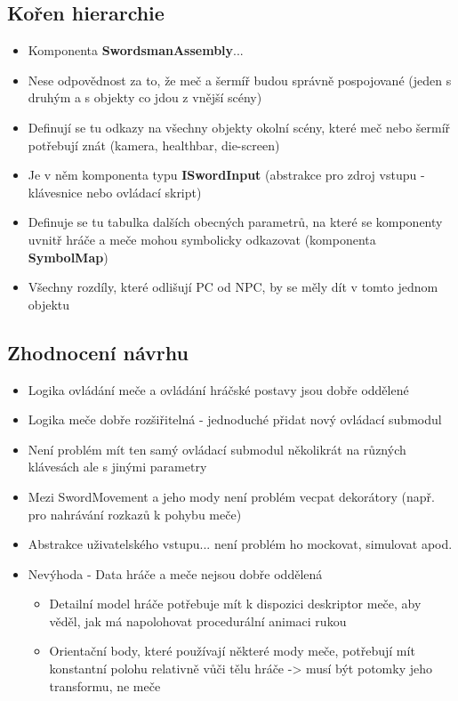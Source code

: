 \subsection{Kořen hierarchie} 
\begin{itemize}
    \item Komponenta \textbf{SwordsmanAssembly}...
    \item Nese odpovědnost za to, že meč a šermíř budou správně pospojované (jeden s druhým a s objekty co jdou z vnější scény)
    \item Definují se tu odkazy na všechny objekty okolní scény, které meč nebo šermíř potřebují znát (kamera, healthbar, die-screen)
    \item Je v něm komponenta typu \textbf{ISwordInput} (abstrakce pro zdroj vstupu - klávesnice nebo ovládací skript)
    \item Definuje se tu tabulka dalších obecných parametrů, na které se komponenty uvnitř hráče a meče mohou symbolicky odkazovat (komponenta \textbf{SymbolMap})
    \item Všechny rozdíly, které odlišují \acs{PC} od \acs{NPC}, by se měly dít v tomto jednom objektu
\end{itemize} 

\subsection{Zhodnocení návrhu} 
\begin{itemize}
    \item Logika ovládání meče a ovládání hráčské postavy jsou dobře oddělené
    \item Logika meče dobře rozšiřitelná - jednoduché přidat nový ovládací submodul
    \item Není problém mít ten samý ovládací submodul několikrát na různých klávesách ale s jinými parametry
    \item Mezi SwordMovement a jeho mody není problém vecpat dekorátory (např. pro nahrávání rozkazů k pohybu meče)
    \item Abstrakce uživatelského vstupu... není problém ho mockovat, simulovat apod.
    \item Nevýhoda - Data hráče a meče nejsou dobře oddělená
        \begin{itemize}
            \item Detailní model hráče potřebuje mít k dispozici deskriptor meče, aby věděl, jak má napolohovat procedurální animaci rukou
            \item Orientační body, které používají některé mody meče, potřebují mít konstantní polohu relativně vůči tělu hráče -> musí být potomky jeho transformu, ne meče
        \end{itemize}
\end{itemize} 


